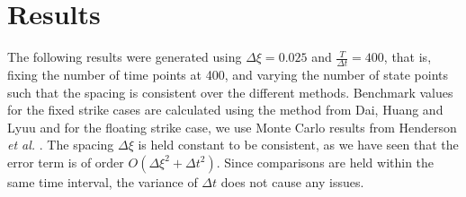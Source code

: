 \documentclass{article}
\begin{document}
\section{Results}
The following results were generated using \(\Delta\xi = 0.025\) and \(\frac{T}{\Delta t} = 400\), that is, fixing the number of time points at 400, and varying the number of state points such that the spacing is consistent over the different methods. Benchmark values for the fixed strike cases are calculated using the method from Dai, Huang and Lyuu \cite{dai_et_al} and for the floating strike case, we use Monte Carlo results from Henderson \textit{et al.} \cite{henderson_et_al}. The spacing \(\Delta\xi\) is held constant to be consistent, as we have seen that the error term is of order \(O(\Delta\xi^2 + \Delta t^2)\). Since comparisons are held within the same time interval, the variance of \(\Delta t\) does not cause any issues.
\end{document}
